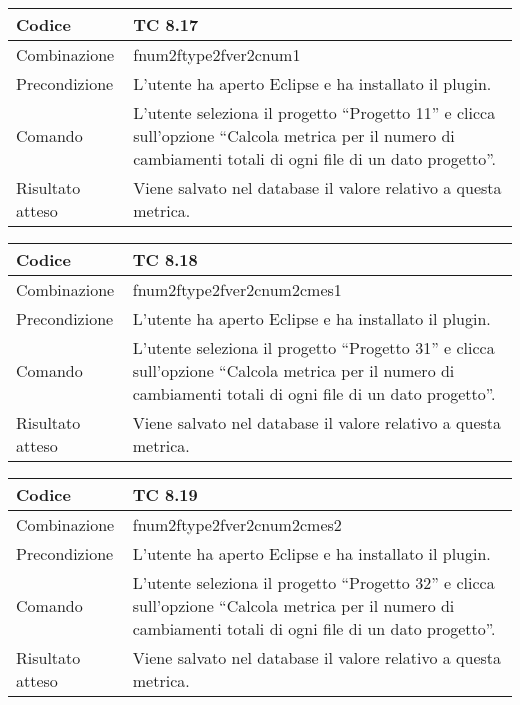 \begin{table}[ht]
\begin{tabular}{|p{3cm}|p{9cm}|}
\hline
\cellcolor{lightgray}Codice				& TC 8.17								\\
\hline
\cellcolor{lightgray}Combinazione		& fnum2ftype2fver2cnum1									\\
\hline
\cellcolor{lightgray}Precondizione		& L'utente ha aperto Eclipse e ha installato il plugin.		\\
\hline
\cellcolor{lightgray}Comando			& L'utente seleziona il progetto ``Progetto 11''  e clicca sull'opzione ``Calcola metrica per il numero di cambiamenti totali di ogni file di un dato progetto''.	\\
\hline
\cellcolor{lightgray}Risultato atteso	& Viene salvato nel database il valore relativo a questa metrica.\\
\hline
\end{tabular}
\end{table}

\begin{table}[ht]
\begin{tabular}{|p{3cm}|p{9cm}|}
\hline
\cellcolor{lightgray}Codice				& TC 8.18								\\
\hline
\cellcolor{lightgray}Combinazione		& fnum2ftype2fver2cnum2cmes1									\\
\hline
\cellcolor{lightgray}Precondizione		& L'utente ha aperto Eclipse e ha installato il plugin.		\\
\hline
\cellcolor{lightgray}Comando			& L'utente seleziona il progetto ``Progetto 31''  e clicca sull'opzione ``Calcola metrica per il numero di cambiamenti totali di ogni file di un dato progetto''.	\\
\hline
\cellcolor{lightgray}Risultato atteso	& Viene salvato nel database il valore relativo a questa metrica.\\
\hline
\end{tabular}
\end{table}

\begin{table}[ht]
\begin{tabular}{|p{3cm}|p{9cm}|}
\hline
\cellcolor{lightgray}Codice				& TC 8.19								\\
\hline
\cellcolor{lightgray}Combinazione		& fnum2ftype2fver2cnum2cmes2									\\
\hline
\cellcolor{lightgray}Precondizione		& L'utente ha aperto Eclipse e ha installato il plugin.		\\
\hline
\cellcolor{lightgray}Comando			& L'utente seleziona il progetto ``Progetto 32''  e clicca sull'opzione ``Calcola metrica per il numero di cambiamenti totali di ogni file di un dato progetto''.	\\
\hline
\cellcolor{lightgray}Risultato atteso	& Viene salvato nel database il valore relativo a questa metrica.\\
\hline
\end{tabular}
\end{table}

